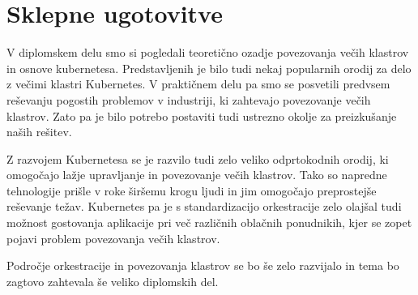\documentclass[a4paper, 12pt]{book}
\begin{document}
\chapter{Sklepne ugotovitve}
V diplomskem delu smo si pogledali teoretično ozadje povezovanja večih klastrov in osnove kubernetesa.
Predstavljenih je bilo tudi nekaj popularnih orodij za delo z večimi klastri Kubernetes.
V praktičnem delu pa smo se posvetili predvsem reševanju pogostih problemov v industriji, ki zahtevajo povezovanje večih klastrov.
Zato pa je bilo potrebo postaviti tudi ustrezno okolje za preizkušanje naših rešitev.

Z razvojem Kubernetesa se je razvilo tudi zelo veliko odprtokodnih orodij, ki omogočajo lažje upravljanje in povezovanje večih klastrov.
Tako so napredne tehnologije prišle v roke širšemu krogu ljudi in jim omogočajo preprostejše reševanje težav.
Kubernetes pa je s standardizacijo orkestracije zelo olajšal tudi možnost gostovanja aplikacije pri več različnih oblačnih ponudnikih, kjer se zopet pojavi problem povezovanja večih klastrov.

Področje orkestracije in povezovanja klastrov se bo še zelo razvijalo in tema bo zagtovo zahtevala še veliko diplomskih del.

\newpage %
\ \\
\clearpage
{}


\end{document}
